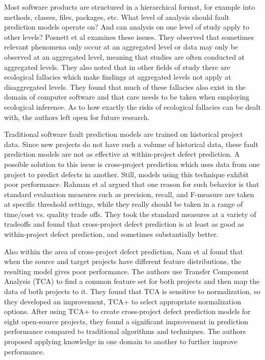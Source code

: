 \documentclass{sig-alternate-05-2015}
\begin{document}
Most software products are structured in a hierarchical format, for example into methods, classes, files, packages, etc. What level of analysis should fault prediction models operate on? And can analysis on one level of study apply to other levels? Posnett et al \cite{Posnett} examines these issues. They observed that sometimes relevant phenomena only occur at an aggregated level or data may only be observed at an aggregated level, meaning that studies are often conducted at aggregated levels. They also noted that in other fields of study there are ecological fallacies which make findings at aggregated levels not apply at disaggregated levels. They found that much of these fallacies also exist in the domain of computer software and that care needs to be taken when employing ecological inference. As to how exactly the risks of ecological fallacies can be dealt with, the authors left open for future research.

Traditional software fault prediction models are trained on historical project data. Since new projects do not have such a volume of historical data, these fault prediction models are not as effective at within-project defect prediction. A possible solution to this issue is cross-project prediction which uses data from one project to predict defects in another. Still, models using this technique exhibit poor performance. Rahman et al \cite{Rahman} argued that one reason for such behavior is that standard evaluation measures such as precision, recall, and F-measure are taken at specific threshold settings, while they really should be taken in a range of time/cost vs. quality trade offs. They took the standard measures at a variety of tradeoffs and found that cross-project defect prediction is at least as good as within-project defect prediction, and sometimes substantially better.

Also within the area of cross-project defect prediction, Nam et al \cite{Nam} found that when the source and target projects have different feature distributions, the resulting model gives poor performance. The authors use Transfer Component Analysis (TCA) to find a common feature set for both projects and then map the data of both projects to it. They found that TCA is sensitive to normalization, so they developed an improvement, TCA+ to select appropriate normalization options. After using TCA+ to create cross-project defect prediction models for eight open-source projects, they found a significant improvement in prediction performance compared to traditional algorithms and techniques. The authors proposed applying knowledge in one domain to another to further improve performance. 
\end{document}
